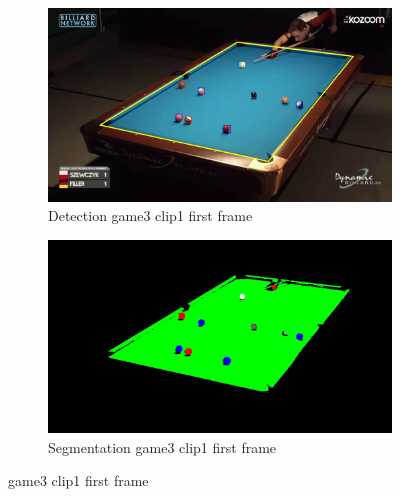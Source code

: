 \begin{figure}[H]
    \centering
    \begin{subfigure}[b]{0.4\textwidth}
        \centering
        \includegraphics[width=\textwidth]{images/Detection/game3_clip1_detected_balls_first_frame.jpg}
        \caption{Detection game3 clip1 first frame}
        \label{fig: game3_clip1_first_frame_detected}
    \end{subfigure}
    \begin{subfigure}[b]{0.4\textwidth}
        \centering
        \includegraphics[width=\textwidth]{images/Segmentation/game3_clip1_segmented_balls_first_frame.jpg}
        \caption{Segmentation game3 clip1 first frame}
		\label{fig: game3_clip1_first_frame_segmented}
    \end{subfigure}
	\caption{game3 clip1 first frame}
\end{figure}

